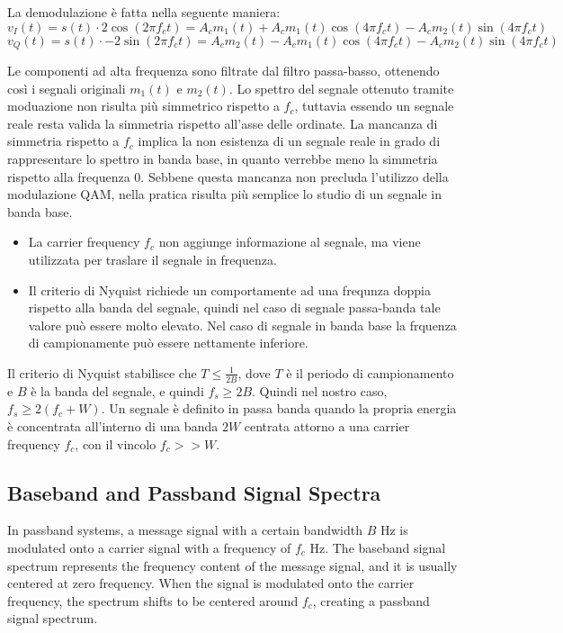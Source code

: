 La demodulazione è fatta nella seguente maniera:
\begin{equation}
    v_I(t) = s(t) \cdot 2\cos(2\pi f_c t) = A_{c} m_1(t) + A_{c} m_1(t) \cos(4\pi f_c t) - A_{c} m_2(t) \sin(4\pi f_c t)
\end{equation}
\begin{equation}
    v_Q(t) = s(t) \cdot -2\sin(2\pi f_c t) = A_{c} m_2(t) - A_{c} m_1(t) \cos(4\pi f_c t) - A_{c} m_2(t) \sin(4\pi f_c t)
\end{equation}

Le componenti ad alta frequenza sono filtrate dal filtro passa-basso, ottenendo così i segnali originali \( m_1(t) \) e \( m_2(t) \).
Lo spettro del segnale ottenuto tramite moduazione non risulta più simmetrico rispetto a $f_c$, tuttavia essendo un segnale reale resta valida la simmetria rispetto all'asse delle ordinate.
La mancanza di simmetria rispetto a $f_c$ implica la non esistenza di un segnale reale in grado di rappresentare lo spettro in banda base, in quanto verrebbe meno la simmetria rispetto alla frequenza 0.
Sebbene questa mancanza non precluda l'utilizzo della modulazione QAM, nella pratica risulta più semplice lo studio di un segnale in banda base.
\begin{itemize}
    \item La carrier frequency \( f_c \) non aggiunge informazione al segnale, ma viene utilizzata per traslare il segnale in frequenza.
    \item Il criterio di Nyquist richiede un comportamente ad una frequnza doppia rispetto alla banda del segnale, quindi nel caso di segnale passa-banda tale valore può essere molto elevato. Nel caso di segnale in banda base la frquenza di campionamente può essere nettamente inferiore.
\end{itemize}

Il criterio di Nyquist stabilisce che \( T \leq \frac{1}{2B} \), dove \( T \) è il periodo di campionamento e \( B \) è la banda del segnale, e quindi \( f_s \geq 2B \). Quindi nel nostro caso, $f_s \geq 2(f_c + W)$.
Un segnale è definito in passa banda quando la propria energia è concentrata all'interno di una banda $2W$ centrata attorno a una carrier frequency $f_c$, con il vincolo $f_c >> W$.  


\subsection*{Baseband and Passband Signal Spectra}
In passband systems, a message signal with a certain bandwidth \( B \) Hz is modulated onto a carrier signal with a frequency of \( f_c \) Hz. The baseband signal spectrum represents the frequency content of the message signal, and it is usually centered at zero frequency. When the signal is modulated onto the carrier frequency, the spectrum shifts to be centered around \( f_c \), creating a passband signal spectrum.

